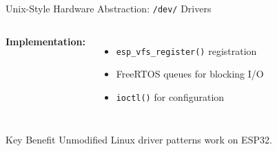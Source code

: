 \documentclass[aspectratio=169, 10pt]{beamer}
\begin{document}
\begin{frame}{Unix-Style Hardware Abstraction: \texttt{/dev/} Drivers}
\begin{columns}[T]
        \vspace{0.1cm}
        \textbf{Implementation:}
        \begin{itemize}\setlength{\itemsep}{0pt}
            \item \texttt{esp\_vfs\_register()} registration
            \item FreeRTOS queues for blocking I/O
            \item \texttt{ioctl()} for configuration
        \end{itemize}
    \end{columns}

    \vspace{0.3cm}
    \begin{exampleblock}{Key Benefit}
        \centering
        Unmodified Linux driver patterns work on ESP32.
    \end{exampleblock}
\end{frame}
\end{document}
